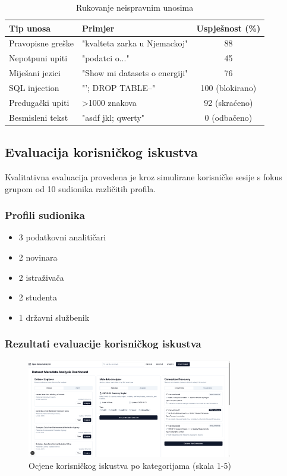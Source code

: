 \begin{table}[htbp]
\centering
\caption{Rukovanje neispravnim unosima}
\label{tab:invalid_input_handling}
\begin{tabular}{|l|l|c|}
\hline
\textbf{Tip unosa} & \textbf{Primjer} & \textbf{Uspješnost (\%)} \\
\hline
Pravopisne greške & "kvalteta zarka u Njemackoj" & 88 \\
Nepotpuni upiti & "podatci o..." & 45 \\
Miješani jezici & "Show mi datasets o energiji" & 76 \\
SQL injection & "'; DROP TABLE--" & 100 (blokirano) \\
Predugački upiti & >1000 znakova & 92 (skraćeno) \\
Besmisleni tekst & "asdf jkl; qwerty" & 0 (odbačeno) \\
\hline
\end{tabular}
\end{table}

\subsection{Evaluacija korisničkog iskustva}

Kvalitativna evaluacija provedena je kroz simulirane korisničke sesije s fokus grupom od 10 sudionika različitih profila.

\subsubsection{Profili sudionika}

\begin{itemize}
    \item 3 podatkovni analitičari
    \item 2 novinara
    \item 2 istraživača
    \item 2 studenta
    \item 1 državni službenik
\end{itemize}

\subsubsection{Rezultati evaluacije korisničkog iskustva}

\begin{figure}[htbp]
    \centering
    \includegraphics[width=0.8\textwidth]{figures/izvjestaj_image_4.png}
    \caption{Ocjene korisničkog iskustva po kategorijama (skala 1-5)}
    \label{fig:user_experience_ratings}
\end{figure}

